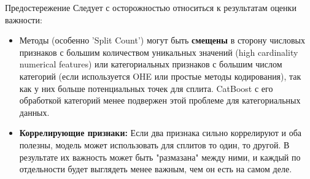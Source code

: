 \begin{alerttextbox}{Предостережение}
    Следует с осторожностью относиться к результатам оценки важности:
    \begin{itemize}[nosep, leftmargin=*]
        \item Методы (особенно 'Split Count') могут быть \textbf{смещены} в сторону числовых признаков с большим количеством уникальных значений (high cardinality numerical features) или категориальных признаков с большим числом категорий (если используется OHE или простые методы кодирования), так как у них больше потенциальных точек для сплита. CatBoost с его обработкой категорий менее подвержен этой проблеме для категориальных данных.
        \item \textbf{Коррелирующие признаки:} Если два признака сильно коррелируют и оба полезны, модель может использовать для сплитов то один, то другой. В результате их важность может быть "размазана" между ними, и каждый по отдельности будет выглядеть менее важным, чем он есть на самом деле.
    \end{itemize}
\end{alerttextbox}

